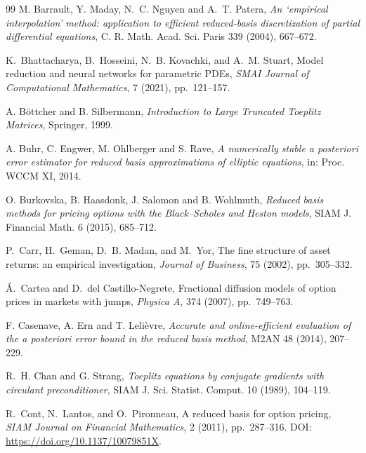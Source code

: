 \begin{thebibliography}{99}
M. Barrault, Y. Maday, N.~C. Nguyen and A.~T. Patera, \emph{An `empirical interpolation' method:
application to efficient reduced-basis discretization of partial differential equations},
C. R. Math. Acad. Sci. Paris 339 (2004), 667--672.

K.~Bhattacharya, B.~Hosseini, N.~B. Kovachki, and A.~M. Stuart,
\newblock Model reduction and neural networks for parametric PDEs,
\newblock \emph{SMAI Journal of Computational Mathematics}, 7 (2021),
pp.~121--157.

A. B\"ottcher and B. Silbermann, \emph{Introduction to Large Truncated Toeplitz Matrices}, Springer, 1999.

A. Buhr, C. Engwer, M. Ohlberger and S. Rave, \emph{A numerically stable a posteriori error
estimator for reduced basis approximations of elliptic equations}, in: Proc. WCCM XI, 2014.

O. Burkovska, B. Haasdonk, J. Salomon and B. Wohlmuth, \emph{Reduced basis methods for pricing
options with the Black--Scholes and Heston models}, SIAM J. Financial Math. 6 (2015), 685--712.

P.~Carr, H.~Geman, D.~B. Madan, and M.~Yor,
\newblock The fine structure of asset returns: an empirical investigation,
\newblock \emph{Journal of Business}, 75 (2002), pp.~305--332.

\'A.~Cartea and D.~del Castillo-Negrete,
\newblock Fractional diffusion models of option prices in markets with jumps,
\newblock \emph{Physica A}, 374 (2007), pp.~749--763.

F. Casenave, A. Ern and T. Leli\`evre, \emph{Accurate and online-efficient evaluation of the a
posteriori error bound in the reduced basis method}, M2AN 48 (2014), 207--229.

R.~H. Chan and G. Strang, \emph{Toeplitz equations by conjugate gradients with circulant
preconditioner}, SIAM J. Sci. Statist. Comput. 10 (1989), 104--119.

R.~Cont, N.~Lantos, and O.~Pironneau,
\newblock A reduced basis for option pricing,
\newblock \emph{SIAM Journal on Financial Mathematics}, 2 (2011),
pp.~287--316. DOI: \url{https://doi.org/10.1137/10079851X}.


\end{thebibliography}
